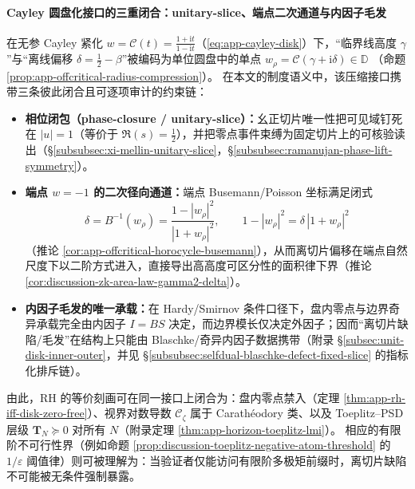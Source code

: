 \paragraph{Cayley 圆盘化接口的三重闭合：unitary-slice、端点二次通道与内因子毛发}
在无参 Cayley 紧化 \(w=\mathcal{C}(t)=\frac{1+\mathrm{i}t}{1-\mathrm{i}t}\)（\eqref{eq:app-cayley-disk}）下，“临界线高度 \(\gamma\)”与“离线偏移 \(\delta=\tfrac12-\beta\)”被编码为单位圆盘中的单点
\(
w_\rho=\mathcal{C}(\gamma+\mathrm{i}\delta)\in\mathbb{D}
\)
（命题 \ref{prop:app-offcritical-radius-compression}）。
在本文的制度语义中，该压缩接口携带三条彼此闭合且可逐项审计的约束链：
\begin{itemize}
  \item \textbf{相位闭包（phase-closure / unitary-slice）：}幺正切片唯一性把可见域钉死在 \(|u|=1\)（等价于 \(\Re(s)=\tfrac12\)），并把零点事件束缚为固定切片上的可核验读出（\S\ref{subsubsec:xi-mellin-unitary-slice}，\S\ref{subsubsec:ramanujan-phase-lift-symmetry}）。
  \item \textbf{端点 \texorpdfstring{$w=-1$}{w=-1} 的二次径向通道：}端点 Busemann/Poisson 坐标满足闭式
  \[
  \delta=B^{-1}(w_\rho)=\frac{1-|w_\rho|^2}{|1+w_\rho|^2},
  \qquad
  1-|w_\rho|^2=\delta\,|1+w_\rho|^2
  \]
  （推论 \ref{cor:app-offcritical-horocycle-busemann}），从而离切片偏移在端点自然尺度下以二阶方式进入，直接导出高高度可区分性的面积律下界（推论 \ref{cor:discussion-zk-area-law-gamma2-delta}）。
  \item \textbf{内因子毛发的唯一承载：}在 Hardy/Smirnov 条件口径下，盘内零点与边界奇异承载完全由内因子 \(I=BS\) 决定，而边界模长仅决定外因子；因而“离切片缺陷/毛发”在结构上只能由 Blaschke/奇异内因子数据携带（附录 \S\ref{subsec:unit-disk-inner-outer}，并见 \S\ref{subsubsec:selfdual-blaschke-defect-fixed-slice} 的指标化排斥链）。
\end{itemize}
由此，RH 的等价刻画可在同一接口上闭合为：盘内零点禁入（定理 \ref{thm:app-rh-iff-disk-zero-free}）、视界对数导数 \(\mathscr{C}_\zeta\) 属于 Carath\'eodory 类、以及 Toeplitz--PSD 层级 \(\mathbf{T}_N\succeq 0\) 对所有 \(N\)（附录定理 \ref{thm:app-horizon-toeplitz-lmi}）。
相应的有限阶不可行性界（例如命题 \ref{prop:discussion-toeplitz-negative-atom-threshold} 的 \(1/\varepsilon\) 阈值律）则可被理解为：当验证者仅能访问有限阶多极矩前缀时，离切片缺陷不可能被无条件强制暴露。

